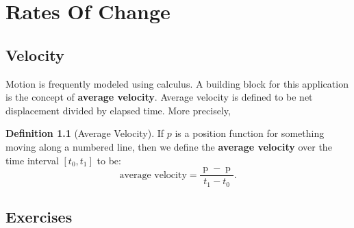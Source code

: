 \documentclass[12pt,]{book}
\newcommand{\terminology}[1]{\textbf{#1}}
\theoremstyle{plain}
\theoremstyle{definition}
\newtheorem{definition}[theorem]{Definition}
\numberwithin{equation}{section}
\newcommand{\fe}[2]{\mathop{{#1}{\left(#2\right)}}}
\newcommand{\cinterval}[2]{\left[#1,#2\right]}
\begin{document}
\chapter[Rates Of Change]{Rates Of Change}\label{chapter-rates-of-change}
\typeout{************************************************}
\typeout{************************************************}
\section[Velocity]{Velocity}\label{section-velocity}
Motion is frequently modeled using calculus. A building block for this application is the concept of \terminology{average velocity}. Average velocity is defined to be net displacement divided by elapsed time.  More precisely,%
\begin{definition}[Average Velocity]\label{definition-average-velocity}
If \(p\) is a position function for something moving along a numbered line, then we define the \terminology{average velocity} over the time interval \(\cinterval{t_0}{t_1}\) to be: \[\text{average velocity}=\frac{\fe{p}{t_1}-\fe{p}{t_0}}{t_1-t_0}\text{.}\]%
\end{definition}
\typeout{************************************************}
\typeout{************************************************}
\section*{Exercises}\label{exercises-1}
\end{document}
